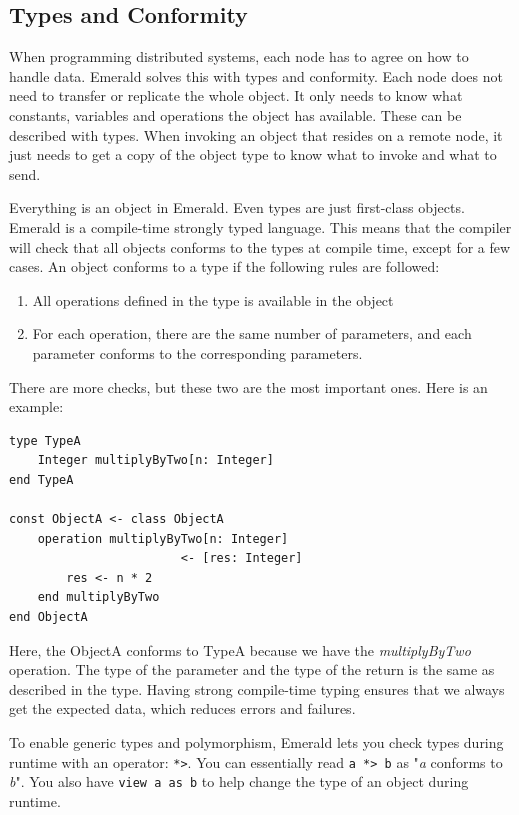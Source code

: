 \subsection{Types and Conformity}
When programming distributed systems, each node has to agree on how to handle data. Emerald solves this with types and conformity. Each node does not need to transfer or replicate the whole object. It only needs to know what constants, variables and operations the object has available. These can be described with types. When invoking an object that resides on a remote node, it just needs to get a copy of the object type to know what to invoke and what to send. 

Everything is an object in Emerald. Even types are just first-class objects. 
Emerald is a compile-time strongly typed language. This means that the compiler will check that all objects conforms to the types at compile time, except for a few cases. An object conforms to a type if the following rules are followed:
\begin{enumerate}
    \item All operations defined in the type is available in the object
    \item For each operation, there are the same number of parameters, and each parameter conforms to the corresponding parameters.
\end{enumerate}
There are more checks, but these two are the most important ones.
Here is an example:
\begin{lstlisting}[language=emerald]
type TypeA
    Integer multiplyByTwo[n: Integer]
end TypeA

const ObjectA <- class ObjectA
    operation multiplyByTwo[n: Integer]
                        <- [res: Integer]
        res <- n * 2
    end multiplyByTwo
end ObjectA
\end{lstlisting}
Here, the ObjectA conforms to TypeA because we have the \textit{multiplyByTwo} operation. The type of the parameter and the type of the return is the same as described in the type. Having strong compile-time typing ensures that we always get the expected data, which reduces errors and failures.

To enable generic types and polymorphism, Emerald lets you check types during runtime with an operator: \verb|*>|. You can essentially read \verb|a *> b| as "\textit{a} conforms to \textit{b}". You also have \verb|view a as b| to help change the type of an object during runtime.




